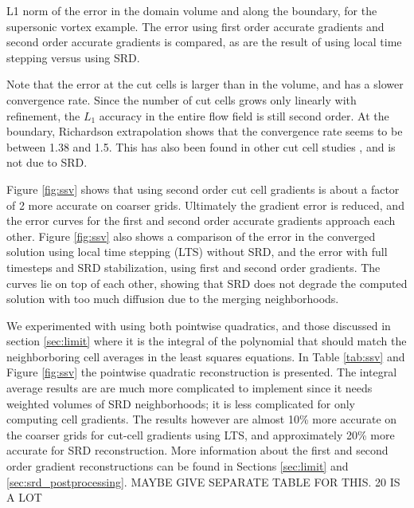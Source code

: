 {\begin{table}[h]
	\caption{\sf L1 norm of the error in the domain volume and along the boundary,
        for the supersonic vortex example. The error using first order accurate
        gradients and second order accurate gradients is compared, as are  the result
        of using local time stepping versus using SRD.\label{tab:ssv}}
\end{table}
}

Note that the error at the cut cells is larger than in the volume, and has a
slower convergence rate. Since the number of cut cells grows only
linearly with refinement, the $L_1$
accuracy in the entire flow field is still second order.  At the boundary,
Richardson extrapolation shows that the convergence rate seems to be
between 1.38 and 1.5.
This has also been found in other cut cell studies \cite{nemec_tm14}, and is not due to
SRD.

Figure \ref{fig:ssv} shows that using second order cut cell gradients is about
a factor of 2 more accurate on coarser grids. Ultimately the gradient
error is reduced, and the error curves for the first and second order 
accurate gradients approach each other. 
Figure \ref{fig:ssv} also shows a comparison of the error in the converged
solution using local time stepping (LTS)  without SRD, and the error with full timesteps and
SRD stabilization, using  first and second order gradients.
The curves lie on top of each other, showing that 
SRD does not degrade the computed solution with too much diffusion due
to the merging neighborhoods.

We experimented with using both pointwise quadratics, and those discussed in
section \ref{sec:limit} where it is the integral of the polynomial that should match the
neighborboring cell averages in the least squares equations. In Table \ref{tab:ssv}  and
Figure \ref{fig:ssv} the pointwise quadratic reconstruction is presented. 
The integral average  results are are much more complicated to implement since 
it needs weighted volumes of SRD neighborhoods; it is less complicated for only computing
cell gradients. The results however are almost 10\% more accurate on the coarser grids
for cut-cell gradients using LTS, and approximately 20\% 
more accurate for SRD reconstruction. 
More information about the first and second order gradient reconstructions can be found in Sections \ref{sec:limit} and \ref{sec:srd_postprocessing}.
MAYBE GIVE SEPARATE TABLE FOR THIS. 20  IS A LOT

